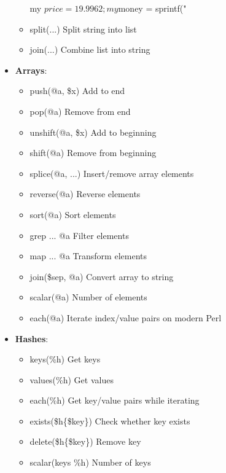 \documentclass{report}
\begin{document}
\begin{itemize}
\begin{itemize}
\begin{perlcode}
                    my $price = 19.9962;
                    my $money = sprintf("%
                    \end{perlcode}
                \item split(...)	Split string into list
                \item join(...)	Combine list into string
            \end{itemize}
        \item \textbf{Arrays}: 
            \begin{itemize}
                \item push(@a, \$x)	Add to end
                \item pop(@a)	Remove from end
                \item unshift(@a, \$x)	Add to beginning
                \item shift(@a)	Remove from beginning
                \item splice(@a, ...)	Insert/remove array elements
                \item reverse(@a)	Reverse elements
                \item sort(@a)	Sort elements
                \item grep { ... } @a	Filter elements
                \item map { ... } @a	Transform elements
                \item join(\$sep, @a)	Convert array to string
                \item scalar(@a)	Number of elements
                \item each(@a)	Iterate index/value pairs on modern Perl
            \end{itemize}
            \bigbreak \noindent 
        \item \textbf{Hashes}:
            \begin{itemize}
                \item keys(\%h)	Get keys
                \item values(\%h)	Get values
                \item each(\%h)	Get key/value pairs while iterating
                \item exists(\$h\{\$key\})	Check whether key exists
                \item delete(\$h\{\$key\})	Remove key
                \item scalar(keys \%h)	Number of keys
            \end{itemize}




\end{itemize}
\end{document}
